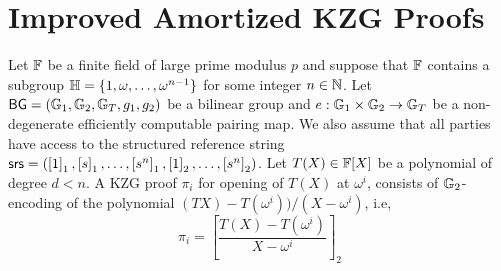 \documentclass[11pt]{article}
\begin{document}
    \section{Improved Amortized KZG Proofs}\label{sec:kzgproofs}
    Let $\mathbb{F}$ be a finite field of large prime modulus $p$ and suppose that $\mathbb{F}$ contains a subgroup
    $\mathbb{H}=\{1,\omega,\ldots,\omega^{n-1}\}$ for some integer $n\in \mathbb{N}$. Let $\mathsf{BG}=(\mathbb{G}_1,\mathbb{G}_2,\mathbb{G}_T,g_1,g_2)$
    be a bilinear group and $e:\mathbb{G}_1\times \mathbb{G}_2\rightarrow \mathbb{G}_T$ be a non-degenerate efficiently computable pairing map.
    We also assume that all parties have access to the structured reference string $\mathsf{srs} = (\left[{1}\right]_1,\left[{s}\right]_1,\ldots,\left[{s^n}\right]_1,
    \left[{1}\right]_2,\ldots,\left[{s^n}\right]_2)$. Let $T(X)\in \mathbb{F}[X]$ be a polynomial of degree $d<n$. A KZG proof $\pi_i$ for opening
    of $T(X)$ at $\omega^i$, consists of $\mathbb{G}_2$-encoding of the polynomial $(TX) - T(\omega^i))/(X-\omega^i)$, i.e,
    \begin{equation*}
        \pi_i = \left[\frac{T(X)-T(\omega^i)}{X-\omega^i}\right]_2
    \end{equation*}


    
    
\end{document}
